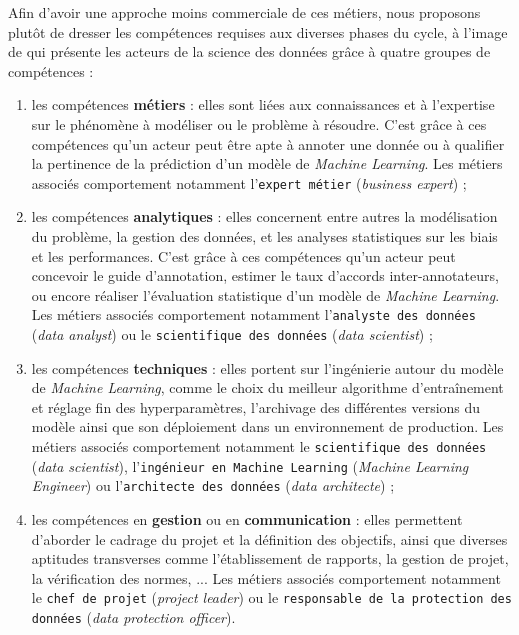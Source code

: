 		Afin d'avoir une approche moins commerciale de ces métiers, nous proposons plutôt de dresser les compétences requises aux diverses phases du cycle, à l'image de \cite{radovilsky-etal:2018:skills-requirements-business} qui présente les acteurs de la science des données grâce à quatre groupes de compétences :
		\begin{enumerate}
			\item les compétences \textbf{métiers} : elles sont liées aux connaissances et à l'expertise sur le phénomène à modéliser ou le problème à résoudre.
			C'est grâce à ces compétences qu'un acteur peut être apte à annoter une donnée ou à qualifier la pertinence de la prédiction d'un modèle de \textit{Machine Learning}.
			Les métiers associés comportement notamment l'\texttt{expert métier} (\textit{business expert}) ;
			\item les compétences \textbf{analytiques} : elles concernent entre autres la modélisation du problème, la gestion des données, et les analyses statistiques sur les biais et les performances.
			C'est grâce à ces compétences qu'un acteur peut concevoir le guide d'annotation, estimer le taux d'accords inter-annotateurs, ou encore réaliser l'évaluation statistique d'un modèle de \textit{Machine Learning}.
			Les métiers associés comportement notamment l'\texttt{analyste des données} (\textit{data analyst}) ou le \texttt{scientifique des données} (\textit{data scientist}) ;
			\item les compétences \textbf{techniques} : elles portent sur l'ingénierie autour du modèle de \textit{Machine Learning}, comme le choix du meilleur algorithme d'entraînement et réglage fin des hyperparamètres, l'archivage des différentes versions du modèle ainsi que son déploiement dans un environnement de production.
			Les métiers associés comportement notamment le \texttt{scientifique des données} (\textit{data scientist}), l'\texttt{ingénieur en Machine Learning} (\textit{Machine Learning Engineer}) ou l'\texttt{architecte des données} (\textit{data architecte}) ;
			\item les compétences en \textbf{gestion} ou en \textbf{communication} : elles permettent d'aborder le cadrage du projet et la définition des objectifs, ainsi que diverses aptitudes transverses comme l'établissement de rapports, la gestion de projet, la vérification des normes, ...
			Les métiers associés comportement notamment le \texttt{chef de projet} (\textit{project leader}) ou le \texttt{responsable de la protection des données} (\textit{data protection officer}).
		\end{enumerate}
